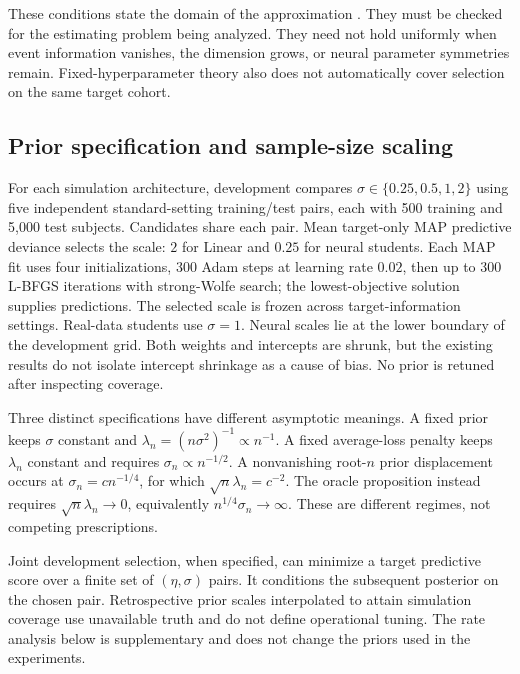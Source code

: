 \documentclass{article} %
\begin{document}
These conditions state the domain of the approximation \citep{vandervaart1998,chernozhukov2003,miller2021}. They must be checked for the estimating problem being analyzed. They need not hold uniformly when event information vanishes, the dimension grows, or neural parameter symmetries remain. Fixed-hyperparameter theory also does not automatically cover selection on the same target cohort.




\subsection{Prior specification and sample-size scaling}
\label{app:prior-specification}
For each simulation architecture, development compares $\sigma\in\{0.25,0.5,1,2\}$ using five independent standard-setting training/test pairs, each with 500 training and 5,000 test subjects. Candidates share each pair. Mean target-only MAP predictive deviance selects the scale: $2$ for Linear and $0.25$ for neural students. Each MAP fit uses four initializations, 300 Adam steps at learning rate $0.02$, then up to 300 L-BFGS iterations with strong-Wolfe search; the lowest-objective solution supplies predictions. The selected scale is frozen across target-information settings. Real-data students use $\sigma=1$. Neural scales lie at the lower boundary of the development grid. Both weights and intercepts are shrunk, but the existing results do not isolate intercept shrinkage as a cause of bias. No prior is retuned after inspecting coverage.

Three distinct specifications have different asymptotic meanings. A fixed prior keeps $\sigma$ constant and $\lambda_n=(n\sigma^2)^{-1}\propto n^{-1}$. A fixed average-loss penalty keeps $\lambda_n$ constant and requires $\sigma_n\propto n^{-1/2}$. A nonvanishing root-$n$ prior displacement occurs at $\sigma_n=c n^{-1/4}$, for which $\sqrt n\lambda_n=c^{-2}$. The oracle proposition instead requires $\sqrt n\lambda_n\to0$, equivalently $n^{1/4}\sigma_n\to\infty$. These are different regimes, not competing prescriptions.

Joint development selection, when specified, can minimize a target predictive score over a finite set of $(\eta,\sigma)$ pairs. It conditions the subsequent posterior on the chosen pair. Retrospective prior scales interpolated to attain simulation coverage use unavailable truth and do not define operational tuning. The rate analysis below is supplementary and does not change the priors used in the experiments.
\end{document}
